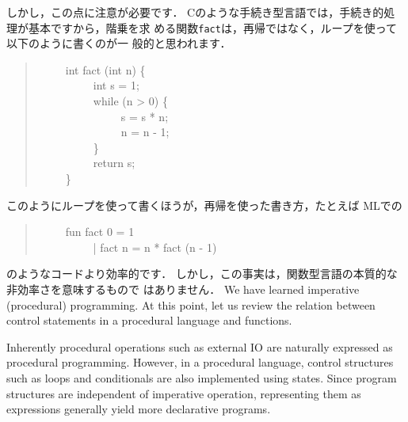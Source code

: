 \documentclass{jbook}
\newcommand{\myem}{\ \ \ \ \  }
\begin{document}
	しかし，この点に注意が必要です．
	Cのような手続き型言語では，手続き的処理が基本ですから，階乗を求
める関数{\tt fact}は，再帰ではなく，ループを使って以下のように書くのが一
般的と思われます．
\begin{tt}
\begin{quote}
\myem int fact (int n) \{\\
\myem\myem   int s = 1;\\
\myem\myem   while (n > 0) \{\\
\myem\myem\myem     s = s * n;\\
\myem\myem\myem     n = n - 1;\\
\myem\myem   \}\\
\myem\myem  return s;\\
\myem \}
\end{quote}
\end{tt}
	このようにループを使って書くほうが，再帰を使った書き方，たとえば
MLでの
\begin{tt}
\begin{quote}
\myem fun fact 0 = 1\\
\myem \ \ \ \ \ | fact n = n * fact (n - 1)
\end{quote}
\end{tt}
のようなコードより効率的です．
	しかし，この事実は，関数型言語の本質的な非効率さを意味するもので
はありません．
\else%
	We have learned imperative (procedural) programming.
	At this point, let us review the relation between control
statements in a procedural language and functions. 

	Inherently procedural operations such as external IO are
naturally expressed as procedural programming.
	However, in a procedural language, control structures such as
loops and conditionals are also implemented using states. 
	Since program structures are independent of imperative
operation, representing them as expressions generally yield more
declarative programs.
\end{document}
